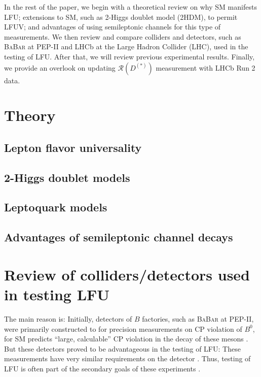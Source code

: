 \documentclass[12pt,letterpaper]{article}
\def\BaBar/{\textsc{BaBar}}
\def\RDDst/{\ensuremath{\mathcal{R}(D^{(*)})}}
\begin{document}
In the rest of the paper, we begin with a theoretical review on
why SM manifests LFU;
extensions to SM, such as 2-Higgs doublet model (2HDM), to permit LFUV;
and advantages of using semileptonic channels for this type of measurements.
We then review and compare colliders and detectors, such as \BaBar/ at PEP-II
and LHCb at the Large Hadron Collider (LHC), used in the testing of LFU.
After that, we will review previous experimental results.
Finally, we provide an overlook on updating $\RDDst/$ measurement with LHCb Run
2 data.

\section{Theory}
\subsection{Lepton flavor universality}


\subsection{2-Higgs doublet models}

\subsection{Leptoquark models}

\subsection{Advantages of semileptonic channel decays}

\section{Review of colliders/detectors used in testing LFU}
The main reason is:
Initially, detectors of $B$ factories, such as \BaBar/ at PEP-II, were
primarily constructed to for precision measurements on CP violation of $B^0$,
for SM predicts ``large, calculable'' CP violation in the decay of these mesons
\cite{Luth:1994}.
But these detectors proved to be advantageous in the testing of LFU:
These measurements have very similar requirements on the
detector \cite{Boutigny:1995ib}.
Thus, testing of LFU is often part of the secondary goals of these
experiments \cite{Luth:1994}.
\end{document}
